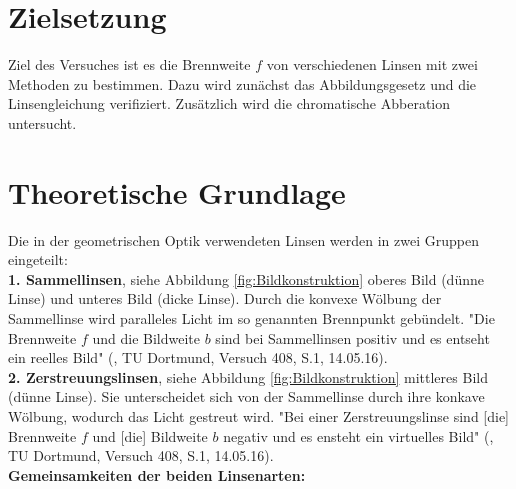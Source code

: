 \section{Zielsetzung}
Ziel des Versuches ist es die Brennweite $f$ von verschiedenen Linsen mit zwei Methoden zu bestimmen. Dazu wird zunächst das Abbildungsgesetz und die Linsengleichung verifiziert. Zusätzlich wird die chromatische Abberation untersucht.

\section{Theoretische Grundlage}
Die in der geometrischen Optik verwendeten Linsen werden in zwei Gruppen eingeteilt: \\
\textbf{1. Sammellinsen}, siehe Abbildung \eqref{fig:Bildkonstruktion} oberes Bild (dünne Linse) und unteres Bild (dicke Linse). Durch die konvexe Wölbung der Sammellinse wird paralleles Licht im so genannten Brennpunkt gebündelt. "Die Brennweite $f$ und die Bildweite $b$ sind bei Sammellinsen positiv und es entseht ein reelles Bild" (\cite{sample}, TU Dortmund, Versuch 408, S.1, 14.05.16). \\
\textbf{2. Zerstreuungslinsen}, siehe Abbildung \eqref{fig:Bildkonstruktion} mittleres Bild (dünne Linse). Sie unterscheidet sich von der Sammellinse durch ihre konkave Wölbung, wodurch das Licht gestreut wird. "Bei einer Zerstreuungslinse sind [die] Brennweite $f$ und [die] Bildweite $b$ negativ und es ensteht ein virtuelles Bild" (\cite{sample}, TU Dortmund, Versuch 408, S.1, 14.05.16). \\
\textbf{Gemeinsamkeiten der beiden Linsenarten:}
